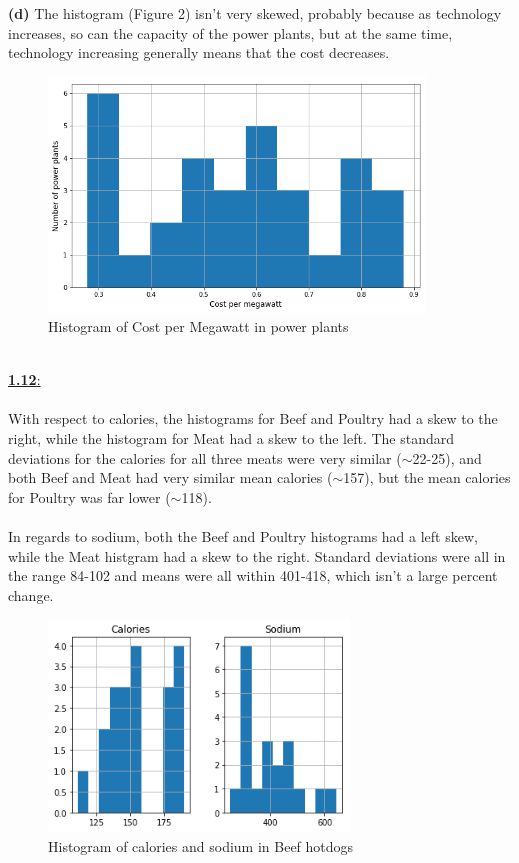 \documentclass[11pt]{article}
\begin{document}
\textbf{(d)} The histogram (Figure 2) isn't very skewed, probably because as technology increases, so can the capacity of the power plants, but at the same time, technology increasing generally means that the cost decreases.
\\
\begin{figure}[h!]
	\centering
	\includegraphics[width=100mm]{cpm.png}
	\caption{Histogram of Cost per Megawatt in power plants}
\end{figure}
\
\\[20mm]
\underline{\textbf{1.12}:} \\ \\
With respect to calories, the histograms for Beef and Poultry had a skew to the right, while the histogram for Meat had a skew to the left. The standard deviations for the calories for all three meats were very similar ($\sim$22-25), and both Beef and Meat had very similar mean calories ($\sim$157), but the mean calories for Poultry was far lower ($\sim$118). \\ \\
In regards to sodium, both the Beef and Poultry histograms had a left skew, while the Meat histgram had a skew to the right. Standard deviations were all in the range 84-102 and means were all within 401-418, which isn't a large percent change.
\begin{figure}[h!]
	\centering
	\includegraphics[width=80mm]{beef_hist.png}
	\caption{Histogram of calories and sodium in Beef hotdogs}
\end{figure}
\end{document}
